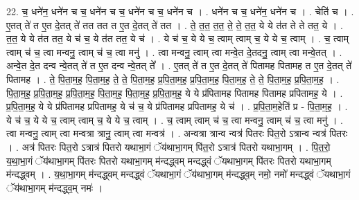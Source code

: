 \documentclass[17pt]{extarticle}
\begin{document}
22. च॒ धने॑न॒ धने॑न च च॒ धने॑न च च॒ धने॑न च च॒ धने॑न च । . धने॑न च च॒ धने॑न॒ धने॑न च । . चेति॑ च । . ए॒तत् ते॑ त ए॒त दे॒तत् ते॑ तत तत त ए॒त दे॒तत् ते॑ तत । . ते॒ त॒त॒ त॒त॒ ते॒ ते॒ त॒त॒ ये ये त॑त ते ते तत॒ ये । . त॒त॒ ये ये त॑त तत॒ ये च॑ च॒ ये त॑त तत॒ ये च॑ । . ये च॑ च॒ ये ये च॒ त्वाम् त्वाम् च॒ ये ये च॒ त्वाम् । . च॒ त्वाम् त्वाम् च॑ च॒ त्वा मन्वनु॒ त्वाम् च॑ च॒ त्वा मनु॑ । . त्वा मन्वनु॒ त्वाम् त्वा मन्वे॒त दे॒तदनु॒ त्वाम् त्वा मन्वे॒तत् । . अन्वे॒त दे॒त दन्व न्वे॒तत् ते॑ त ए॒त दन्व न्वे॒तत् ते᳚ । . ए॒तत् ते॑ त ए॒त दे॒तत् ते॑ पितामह पितामह त ए॒त दे॒तत् ते॑ पितामह । . ते॒ पि॒ता॒म॒ह॒ पि॒ता॒म॒ह॒ ते॒ ते॒ पि॒ता॒म॒ह॒ प्र॒पि॒ता॒म॒ह॒ प्र॒पि॒ता॒म॒ह॒ पि॒ता॒म॒ह॒ ते॒ ते॒ पि॒ता॒म॒ह॒ प्र॒पि॒ता॒म॒ह॒ । . पि॒ता॒म॒ह॒ प्र॒पि॒ता॒म॒ह॒ प्र॒पि॒ता॒म॒ह॒ पि॒ता॒म॒ह॒ पि॒ता॒म॒ह॒ प्र॒पि॒ता॒म॒ह॒ ये ये प्र॑पितामह पितामह पितामह प्रपितामह॒ ये । . प्र॒पि॒ता॒म॒ह॒ ये ये प्र॑पितामह प्रपितामह॒ ये च॑ च॒ ये प्र॑पितामह प्रपितामह॒ ये च॑ । . प्र॒पि॒ता॒म॒हेति॑ प्र - पि॒ता॒म॒ह॒ । . ये च॑ च॒ ये ये च॒ त्वाम् त्वाम् च॒ ये ये च॒ त्वाम् । . च॒ त्वाम् त्वाम् च॑ च॒ त्वा मन्वनु॒ त्वाम् च॑ च॒ त्वा मनु॑ । . त्वा मन्वनु॒ त्वाम् त्वा मन्वत्रा त्रानु॒ त्वाम् त्वा मन्वत्र॑ । . अन्वत्रा त्रान्व न्वत्र॑ पितरः पित॒रो ऽत्रान्व न्वत्र॑ पितरः । . अत्र॑ पितरः पित॒रो ऽत्रात्र॑ पितरो यथाभा॒गं ॅय॑थाभा॒गम् पि॑त॒रो ऽत्रात्र॑ पितरो यथाभा॒गम् । . पि॒त॒रो॒ य॒था॒भा॒गं ॅय॑थाभा॒गम् पि॑तरः पितरो यथाभा॒गम् म॑न्दद्ध्वम् मन्दद्ध्वं ॅयथाभा॒गम् पि॑तरः पितरो यथाभा॒गम् म॑न्दद्ध्वम् । . य॒था॒भा॒गम् म॑न्दद्ध्वम् मन्दद्ध्वं ॅयथाभा॒गं ॅय॑थाभा॒गम् म॑न्दद्ध्व॒म् नमो॒ नमो॑ मन्दद्ध्वं ॅयथाभा॒गं ॅय॑थाभा॒गम् म॑न्दद्ध्व॒म् नमः॑ । \newline
\end{document}
